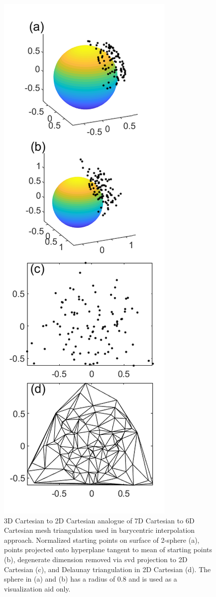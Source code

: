 \documentclass[preprint,12pt]{elsarticle}
\begin{document}
\begin{figure}
    \centering
    \includegraphics{bary-delaunay.png}
    \caption{3D Cartesian to 2D Cartesian analogue of 7D Cartesian to 6D Cartesian mesh triangulation used in barycentric interpolation approach. Normalized starting points on surface of 2-sphere (a), points projected onto hyperplane tangent to mean of starting points (b), degenerate dimension removed via \acrlong{svd} projection to 2D Cartesian (c), and Delaunay triangulation in 2D Cartesian (d). The sphere in (a) and (b) has a radius of 0.8 and is used as a visualization aid only.}
    \label{fig:bary-delaunay}
\end{figure}
\end{document}

